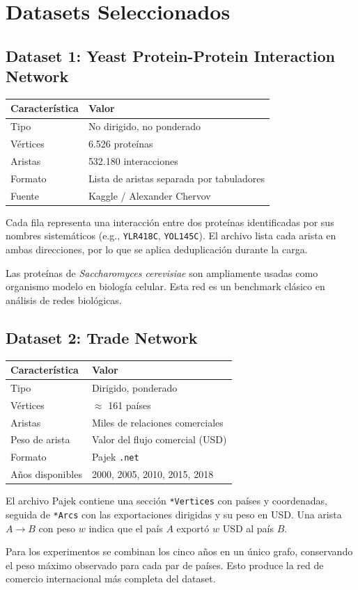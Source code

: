\section{Datasets Seleccionados}

\subsection{Dataset 1: Yeast Protein-Protein Interaction Network}

\begin{center}
\begin{tabular}{ll}
\toprule
\textbf{Característica} & \textbf{Valor} \\
\midrule
Tipo & No dirigido, no ponderado \\
Vértices & 6.526 proteínas \\
Aristas & 532.180 interacciones \\
Formato & Lista de aristas separada por tabuladores \\
Fuente & Kaggle / Alexander Chervov \\
\bottomrule
\end{tabular}
\end{center}

Cada fila representa una interacción entre dos proteínas identificadas por sus nombres
sistemáticos (e.g., \texttt{YLR418C}, \texttt{YOL145C}). El archivo lista cada arista
en ambas direcciones, por lo que se aplica deduplicación durante la carga.

Las proteínas de \textit{Saccharomyces cerevisiae} son ampliamente usadas como
organismo modelo en biología celular. Esta red es un benchmark clásico en análisis
de redes biológicas.

\subsection{Dataset 2: Trade Network}

\begin{center}
\begin{tabular}{ll}
\toprule
\textbf{Característica} & \textbf{Valor} \\
\midrule
Tipo & Dirigido, ponderado \\
Vértices & $\approx$ 161 países \\
Aristas & Miles de relaciones comerciales \\
Peso de arista & Valor del flujo comercial (USD) \\
Formato & Pajek \texttt{.net} \\
Años disponibles & 2000, 2005, 2010, 2015, 2018 \\
\bottomrule
\end{tabular}
\end{center}

El archivo Pajek contiene una sección \texttt{*Vertices} con países y coordenadas,
seguida de \texttt{*Arcs} con las exportaciones dirigidas y su peso en USD.
Una arista $A \to B$ con peso $w$ indica que el país $A$ exportó $w$ USD al país $B$.

Para los experimentos se combinan los cinco años en un único grafo, conservando
el peso máximo observado para cada par de países. Esto produce la red de comercio
internacional más completa del dataset.
